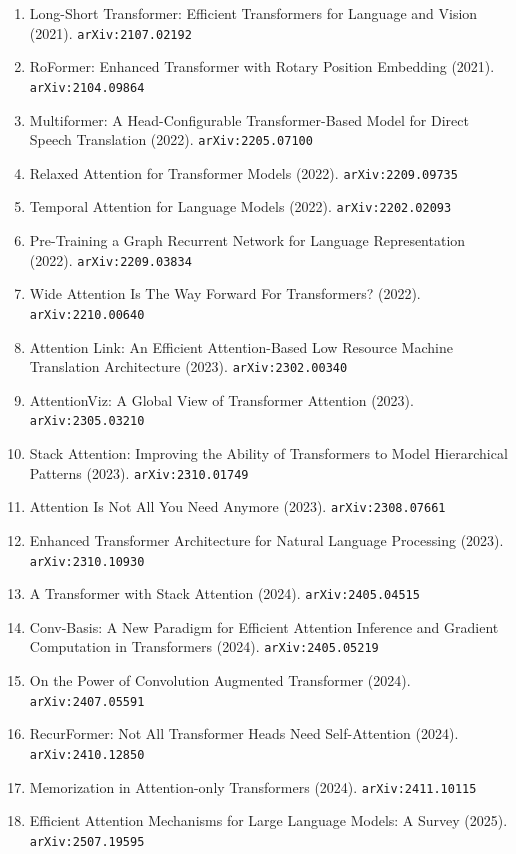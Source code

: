 \documentclass[11pt]{article}
\begin{document}
\begin{enumerate}
  Representations for Language Modeling (2021). \texttt{arXiv:2104.01572}
  \item Long-Short Transformer: Efficient Transformers for Language and Vision (2021). \texttt{arXiv:2107.02192}
  \item RoFormer: Enhanced Transformer with Rotary Position Embedding (2021). \texttt{arXiv:2104.09864}
  \item Multiformer: A Head-Configurable Transformer-Based Model for Direct
  Speech Translation (2022). \texttt{arXiv:2205.07100}
  \item Relaxed Attention for Transformer Models (2022). \texttt{arXiv:2209.09735}
  \item Temporal Attention for Language Models (2022). \texttt{arXiv:2202.02093}
  \item Pre-Training a Graph Recurrent Network for Language Representation (2022). \texttt{arXiv:2209.03834}
  \item Wide Attention Is The Way Forward For Transformers? (2022). \texttt{arXiv:2210.00640}
  \item Attention Link: An Efficient Attention-Based Low Resource Machine
  Translation Architecture (2023). \texttt{arXiv:2302.00340}
  \item AttentionViz: A Global View of Transformer Attention (2023). \texttt{arXiv:2305.03210}
  \item Stack Attention: Improving the Ability of Transformers to Model
  Hierarchical Patterns (2023). \texttt{arXiv:2310.01749}
  \item Attention Is Not All You Need Anymore (2023). \texttt{arXiv:2308.07661}
  \item Enhanced Transformer Architecture for Natural Language Processing (2023). \texttt{arXiv:2310.10930}
  \item A Transformer with Stack Attention (2024). \texttt{arXiv:2405.04515}
  \item Conv-Basis: A New Paradigm for Efficient Attention Inference and
  Gradient Computation in Transformers (2024). \texttt{arXiv:2405.05219}
  \item On the Power of Convolution Augmented Transformer (2024). \texttt{arXiv:2407.05591}
  \item RecurFormer: Not All Transformer Heads Need Self-Attention (2024). \texttt{arXiv:2410.12850}
  \item Memorization in Attention-only Transformers (2024). \texttt{arXiv:2411.10115}
  \item Efficient Attention Mechanisms for Large Language Models: A Survey (2025). \texttt{arXiv:2507.19595}

\end{enumerate}
\end{document}
